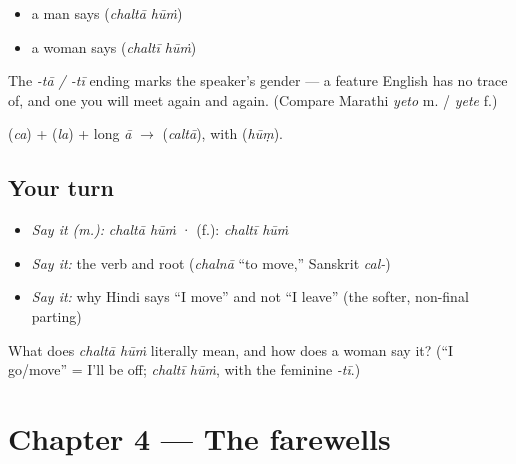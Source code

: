 \begin{grammarlens}[title={Grammar Lens: the verb agrees with the speaker's gender}]
\begin{itemize}
\raggedright
  \item a man says \textbf{ } (\emph{chaltā hūṁ})
  \item a woman says \textbf{ } (\emph{chaltī hūṁ})
\end{itemize}

The \emph{-tā / -tī} ending marks the speaker's gender — a feature English has no trace of, and one you will meet again and again. (Compare Marathi \emph{yeto} m. / \emph{yete} f.)
\end{grammarlens}

\begin{sounds}
 (\emph{ca}) +  (\emph{la}) + long \emph{ā} $\to$  (\emph{caltā}), with  (\emph{hūṃ}).
\end{sounds}

\subsection*{Your turn}
\begin{itemize}
\raggedright
  \item \emph{Say it (m.):} \emph{chaltā hūṁ}  ·  (f.): \emph{chaltī hūṁ}
  \item \emph{Say it:} the verb and root (\emph{chalnā} \textquotedblleft{}to move,\textquotedblright{} Sanskrit \emph{cal-})
  \item \emph{Say it:} why Hindi says \textquotedblleft{}I move\textquotedblright{} and not \textquotedblleft{}I leave\textquotedblright{} (the softer, non-final parting)
\end{itemize}

\begin{tcolorbox}[breakable,colback=teal!4,colframe=teal!35!black,title={Before you move on}]
What does \emph{chaltā hūṁ} literally mean, and how does a woman say it? (\textquotedblleft{}I go/move\textquotedblright{} = I'll be off; \emph{chaltī hūṁ}, with the feminine \emph{-tī}.)
\end{tcolorbox}
\section[Practice]{Chapter 4 — The farewells}

\label{lesson:HI-C04-practice}



